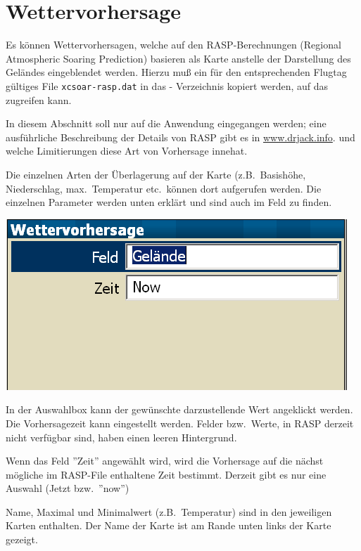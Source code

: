 \section{Wettervorhersage}
Es können Wettervorhersagen, welche auf den RASP-Berechnungen (Regional Atmospheric
Soaring Prediction) basieren als Karte anstelle der Darstellung des Geländes eingeblendet werden.
Hierzu muß ein für den entsprechenden Flugtag gültiges File \verb"xcsoar-rasp.dat"  in
das \xc - Verzeichnis kopiert werden, auf das  \xc zugreifen kann.

In diesem Abschnitt soll nur auf die Anwendung eingegangen werden; eine ausführliche
Beschreibung der Details von RASP gibt es in  \url{www.drjack.info}.
und welche Limitierungen diese Art von Vorhersage innehat.


Die einzelnen Arten der Überlagerung auf der Karte (z.B.\ Basishöhe, Niederschlag,
max.\ Temperatur etc.\  können dort aufgerufen werden.
Die einzelnen Parameter werden unten erklärt und sind auch im Feld  zu finden.

\begin{center}
\includegraphics[angle=0,width=0.5\linewidth,keepaspectratio='true']{figures/dialog-weather.png}
\end{center}

In der Auswahlbox kann der gewünschte darzustellende Wert angeklickt werden.
Die Vorhersagezeit kann eingestellt werden. Felder bzw.\ Werte, in RASP derzeit nicht verfügbar sind,
haben einen leeren Hintergrund.

Wenn das Feld ''Zeit''  angewählt wird, wird die Vorhersage auf die nächst mögliche im RASP-File
enthaltene Zeit bestimmt. Derzeit gibt es nur eine Auswahl (Jetzt bzw.\ ''now'')

Name, Maximal und Minimalwert (z.B.\ Temperatur) sind in den jeweiligen Karten enthalten.
Der Name der Karte ist am Rande unten links der Karte gezeigt.

